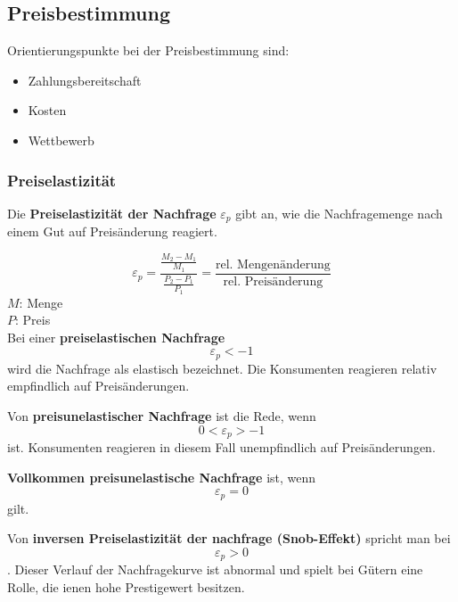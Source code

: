 \documentclass[12pt]{article}
\begin{document}
\subsection{Preisbestimmung}
Orientierungspunkte bei der Preisbestimmung sind:
\begin{itemize}
    \item Zahlungsbereitschaft
    \item Kosten 
    \item Wettbewerb
\end{itemize}

\subsubsection{Preiselastizität}
\begin{Definitionsbox}
    Die \textbf{Preiselastizität der Nachfrage} $\varepsilon_p$ gibt an, wie die Nachfragemenge nach einem Gut auf Preisänderung reagiert.
\end{Definitionsbox}
\begin{equation}
    \varepsilon_p = \frac{\frac{M_2-M_1}{M_1}}{\frac{P_2-P_1}{P_1}} = \frac{\text{rel. Mengenänderung}}{\text{rel. Preisänderung}}
\end{equation}
$M$: Menge\\
$P$: Preis
\\[10pt]
Bei einer \textbf{preiselastischen Nachfrage}
\begin{equation*}
    \varepsilon_p < -1
\end{equation*}
wird die Nachfrage als elastisch bezeichnet. Die Konsumenten reagieren relativ empfindlich auf Preisänderungen.

Von \textbf{preisunelastischer Nachfrage} ist die Rede, wenn
\begin{equation*}
    0 < \varepsilon_p > -1
\end{equation*}
ist. Konsumenten reagieren in diesem Fall unempfindlich auf Preisänderungen.

\newpage
\textbf{Vollkommen preisunelastische Nachfrage} ist, wenn
\begin{equation*}
    \varepsilon_p = 0
\end{equation*}
gilt.

Von \textbf{inversen Preiselastizität der nachfrage (Snob-Effekt)} spricht man bei
\begin{equation*}
    \varepsilon_p > 0
\end{equation*}
. Dieser Verlauf der Nachfragekurve ist abnormal und spielt bei Gütern eine Rolle, die ienen hohe Prestigewert besitzen.
\end{document}
